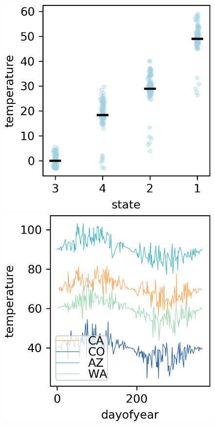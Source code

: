 \documentclass[12pt]{article}
\begin{document}
\begin{figure}[htbp]
\begin{center}
\includegraphics[scale=0.7]{images/state_vs_temp_stratpd.png}
\includegraphics[scale=0.7]{images/dayofyear_vs_temp.png}

\end{center}
\end{figure}
\end{document}
